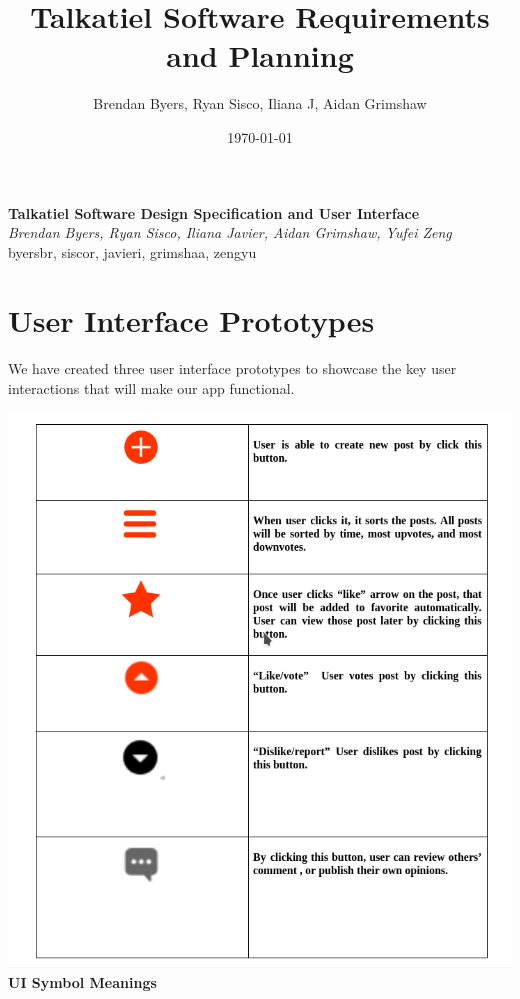 \documentclass[12pt]{article}
\title{Talkatiel Software Requirements and Planning}
\author{Brendan Byers, Ryan Sisco, Iliana J, Aidan Grimshaw}
\date{\today}
\begin{document}
\begin{center}
      \Large\textbf{Talkatiel Software Design Specification and User Interface}\\
      \large\textit{Brendan Byers, Ryan Sisco, Iliana Javier, Aidan Grimshaw, Yufei Zeng}\\
      \large{byersbr, siscor, javieri, grimshaa, zengyu}\\
   \end{center}

\tableofcontents

\section{User Interface Prototypes}
We have created three user interface prototypes to showcase the key user interactions that will make our app functional.

\begin{center}
\includegraphics[scale=0.60]{img/ui/uiTable}\linebreak
\textbf{UI Symbol Meanings}
  \end{center}
\end{document}
